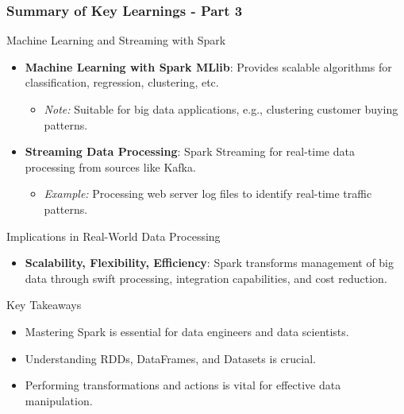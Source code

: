\documentclass[aspectratio=169]{beamer}
\begin{document}
\begin{frame}[fragile]
  \frametitle{Summary of Key Learnings - Part 3}
  \begin{block}{Machine Learning and Streaming with Spark}
      \begin{itemize}
          \item \textbf{Machine Learning with Spark MLlib}:
          Provides scalable algorithms for classification, regression, clustering, etc.
          \begin{itemize}
              \item \textit{Note:} Suitable for big data applications, e.g., clustering customer buying patterns.
          \end{itemize}
          \item \textbf{Streaming Data Processing}:
          Spark Streaming for real-time data processing from sources like Kafka.
          \begin{itemize}
              \item \textit{Example:} Processing web server log files to identify real-time traffic patterns.
          \end{itemize}
      \end{itemize}
  \end{block}

  \begin{block}{Implications in Real-World Data Processing}
      \begin{itemize}
          \item \textbf{Scalability, Flexibility, Efficiency}:
          Spark transforms management of big data through swift processing, integration capabilities, and cost reduction.
      \end{itemize}
  \end{block}
  
  \begin{block}{Key Takeaways}
      \begin{itemize}
          \item Mastering Spark is essential for data engineers and data scientists.
          \item Understanding RDDs, DataFrames, and Datasets is crucial.
          \item Performing transformations and actions is vital for effective data manipulation.
      \end{itemize}
  \end{block}
\end{frame}
\end{document}

